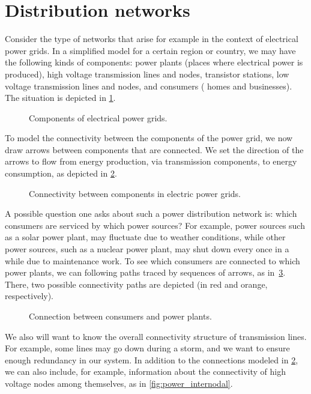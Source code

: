 \section{Distribution networks}\label{sec:connection-distribution-networks}

Consider the type of networks that arise for example in the context of electrical power grids. In a simplified model for a certain region or country, we may have the following kinds of components: power plants (places where electrical power is produced), high voltage transmission lines and nodes, transistor stations, low voltage transmission lines and nodes, and consumers ( homes and businesses). The situation is depicted in \cref{fig:power_nodes}.

\begin{figure}[h!]
    \centering
    \caption{Components of electrical power grids.}
    \label{fig:power_nodes}
\end{figure}
To model the connectivity between the components of the power grid, we now draw arrows between components that are connected. We set the direction of the arrows to flow from energy production, via transmission components, to energy consumption, as depicted in \cref{fig:power_nodes_connected}.
\begin{figure}[h!]
    \centering
    \caption{Connectivity between components in electric power grids.}
    \label{fig:power_nodes_connected}
\end{figure}

A possible question one asks about such a power distribution network is: which consumers are serviced by which power sources? For example, power sources such as a solar power plant, may fluctuate due to weather conditions, while other power sources, such as a nuclear power plant, may shut down every once in a while due to maintenance work. To see which consumers are connected to which power plants, we can following paths traced by sequences of arrows, as in~\cref{fig:power_paths}. There, two possible connectivity paths are depicted (in red and orange, respectively).


\begin{figure}[h!]
    \centering
    \caption{Connection between consumers and power plants.}
    \label{fig:power_paths}
\end{figure}


We also will want to know the overall connectivity structure of transmission lines. For example, some lines may go down during a storm, and we want to ensure enough redundancy in our system. In addition to the connections modeled in \cref{fig:power_nodes_connected}, we can also include, for example, information about the connectivity of high voltage nodes among themselves, as in \cref{fig:power_internodal}.

